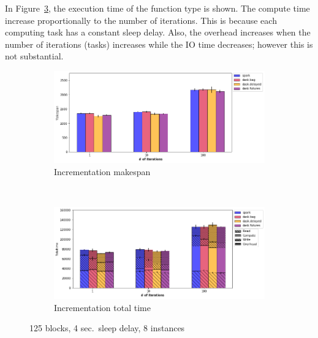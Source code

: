 \documentclass[conference]{IEEEtran}
\begin{document}
In Figure~\ref{fig:inc_tt_itr}, the execution time of the function type is shown. The
compute time increase proportionally to the number of iterations. This is because
each computing task has a constant sleep delay. Also, the overhead increases when the
number of iterations (tasks) increases while the IO time decreases; however this is
not substantial.



\begin{figure}[!t]
    \centering
    \begin{subfigure}[b]{\columnwidth}
        \includegraphics[clip,width=\columnwidth]{images/inc_itr.png}%
        \caption{Incrementation makespan}\label{fig:inc_ms_itr}
    \end{subfigure}
    \\
    \begin{subfigure}[b]{\columnwidth}
        \includegraphics[clip,width=\columnwidth]{images/inc_idle_itr.png}%
        \caption{Incrementation total time}\label{fig:inc_tt_itr}
    \end{subfigure}
    \caption{125 blocks, 4 sec.\ sleep delay, 8 instances}
\end{figure}
\end{document}
